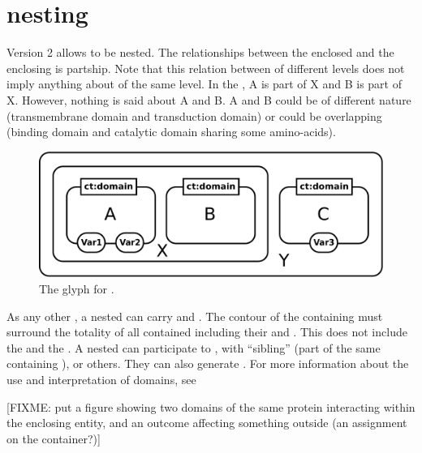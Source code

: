
\section{ nesting }
\label{sec:domain}

\SBGNERLone Version 2 allows  to be nested. The relationships between the enclosed  and the enclosing  is partship. Note that this relation between  of different levels does not imply anything about  of the same level. In the , A is part of X and B is part of X. However, nothing is said about A and B. A and B could be of different nature (transmembrane domain and transduction domain) or could be overlapping (binding domain and catalytic domain sharing some amino-acids). 

\begin{figure}[H]
  \centering
  \includegraphics[scale = 0.3]{images/domain}
  \caption{The \ER glyph for .}
  \label{fig:domain}
\end{figure}

As any other , a nested  can carry  and . The contour of the containing  must surround the totality of all contained  including their  and . This does not include the  and the . A nested  can participate to , with ``sibling''  (part of the same containing ), or others. They can also generate . For more information about the use and interpretation of domains, see  

[FIXME: put a figure showing two domains of the same protein interacting within the enclosing entity, and an outcome affecting something outside (an assignment on the container?)]

